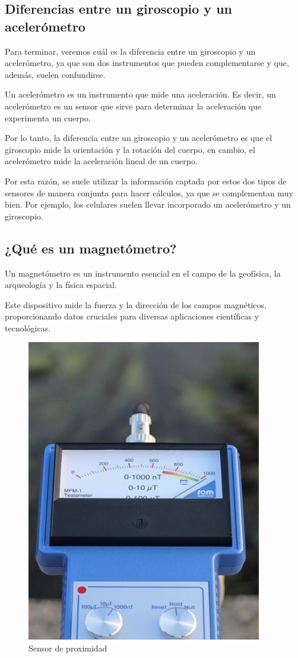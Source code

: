 \subsection{Diferencias entre un giroscopio y un acelerómetro}

Para terminar, veremos cuál es la diferencia entre un giroscopio y un acelerómetro, ya que son dos instrumentos que pueden complementarse y que, además, suelen confundirse.

Un acelerómetro es un instrumento que mide una aceleración. Es decir, un acelerómetro es un sensor que sirve para determinar la aceleración que experimenta un cuerpo.

Por lo tanto, la diferencia entre un giroscopio y un acelerómetro es que el giroscopio mide la orientación y la rotación del cuerpo, en cambio, el acelerómetro mide la aceleración lineal de un cuerpo.

Por esta razón, se suele utilizar la información captada por estos dos tipos de sensores de manera conjunta para hacer cálculos, ya que se complementan muy bien. Por ejemplo, los celulares suelen llevar incorporado un acelerómetro y un giroscopio.

\subsection{¿Qué es un magnetómetro?}

Un magnetómetro es un instrumento esencial en el campo de la geofísica, la arqueología y la física espacial.

Este dispositivo mide la fuerza y la dirección de los campos magnéticos, proporcionando datos cruciales para diversas aplicaciones científicas y tecnológicas.


\begin{figure}[h]
	\centering
	\includegraphics[width=0.7\linewidth]{img/magnometro.jpg}
	\caption{Sensor de proximidad}
	\label{fig:insertarimagen}
\end{figure}

